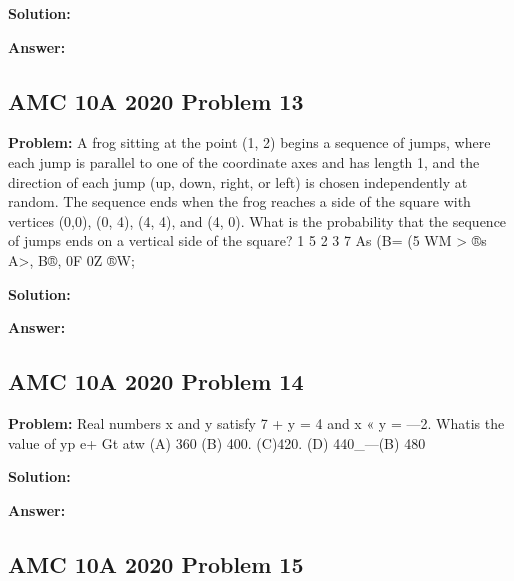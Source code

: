 \documentclass{article}
\newenvironment{problem}{\textbf{Problem: }}{\\}
\newenvironment{solution}{\textbf{Solution: }}{\\}
\newenvironment{answer}{\textbf{Answer: }}{\\}
\begin{document}
\begin{solution}
\end{solution}

\begin{answer}
\end{answer}

\subsection{AMC 10A 2020 Problem 13}

\begin{problem}
A frog sitting at the point (1, 2) begins a sequence of jumps, where each jump is parallel to one of the coordinate axes and has length 1, and the direction of each jump (up, down, right, or left) is chosen independently at random. The sequence ends when the frog reaches a side of the square with vertices (0,0), (0, 4), (4, 4), and (4, 0). What is the probability that the sequence of jumps ends on a vertical side of the square? 1 5 2 3 7 As (B= (5 WM > ®s A>, B®, 0F 0Z ®W;
\end{problem}

\begin{solution}
\end{solution}

\begin{answer}
\end{answer}

\subsection{AMC 10A 2020 Problem 14}

\begin{problem}
Real numbers x and y satisfy 7 + y = 4 and x « y = —2. Whatis the value of yp e+ Gt atw (A) 360 (B) 400. (C)420. (D) 440_—(B) 480
\end{problem}

\begin{solution}
\end{solution}

\begin{answer}
\end{answer}

\subsection{AMC 10A 2020 Problem 15}
\end{document}
